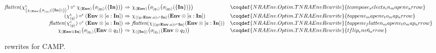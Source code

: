 \begin{figure*}[ht]
  \begin{minipage}{0.99\linewidth}
    \centering
    \[\begin{array}{r@{\ }c@{\ }ll}
    \opflatten(\qmapenv{\qmap{\qENV}{\qselect{q_1}{\{ \qID \}}}}) \circ^e \qmap{\qENV}{\qselect{q_2}{\{ \qID \}}} & \Rightarrow&\qmap{\qENV}{\qselect{q_1}{\qselect{q_2}{\{ \qID \}}}}
    & \coqdef{NRAEnv.Optim.TNRAEnvRewrite}{tcompose_selects_in_mapenv_arrow}
    \\
    (\qmapenv{q}) \circ^e (\qENV \opmergeconcat [ a : \qID ]) & \Rightarrow& \qmap{(q \circ \qENV.a) \circ^e \qID}{\qENV \opmergeconcat [ a : \qID ]}
    & \coqdef{NRAEnv.Optim.TNRAEnvRewrite}{tappenv_mapenv_to_map_arrow}
    \\
    \opflatten(\qmapenv{q}) \circ^e (\qENV \opmergeconcat [ a : \qID ]) & \Rightarrow& \opflatten(\qmap{( q \circ \qENV.a ) \circ^e \qID}{\qENV \opmergeconcat [ a : \qID ]})
    & \coqdef{NRAEnv.Optim.TNRAEnvRewrite}{tappenv_flatten_mapenv_to_map_arrow}
    \\
    \qmap{\qENV \opmergeconcat \qID}{\qselect{q_1}{\qENV \opmergeconcat q_2}} & \Rightarrow& \qmap{\{ \qID \}}{\qselect{q_1}{\qENV \opmergeconcat q_2}}
    & \coqdef{NRAEnv.Optim.TNRAEnvRewrite}{tflip_env6_arrow}
    \end{array}\]
  \end{minipage}  \vspace*{1.5mm}
  \caption{\NRAEnv\ rewrites for CAMP.}
  \label{tab:rewrites-nraenv}
\end{figure*}

